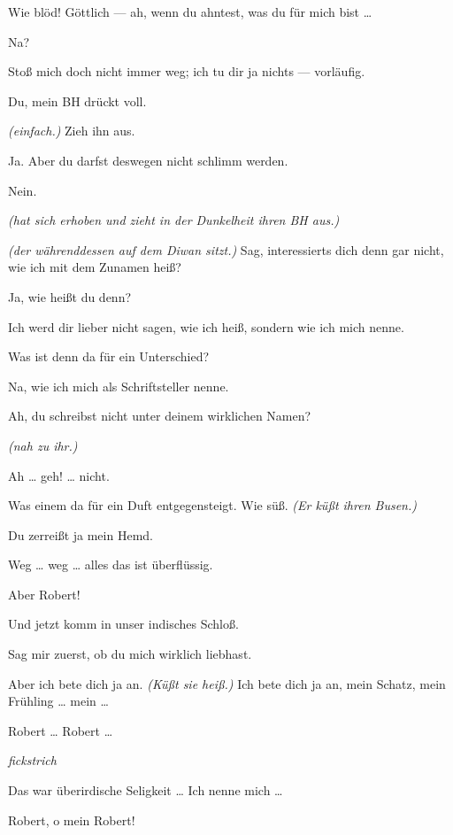 \documentclass[
	final,
	a4paper,
	ngerman,
	mpinclude = true, %
	twoside = true,
	open = right,
	cleardoublepage = plain,
	DIV = 13,
	BCOR = 1cm,
	titlepage = firstiscover,
	]{scrbook}
\newcommand{\direction}[1]{\textit{(#1)}}
\newcommand{\hiat}{%
	\begin{center}
		\tiny
		\raisebox{0.5ex}{\rule{0.3\linewidth}{0.4pt}}
		\textit{fickstrich}
		\raisebox{0.5ex}{\rule{0.3\linewidth}{0.4pt}}
	\end{center}
}
\newcommand{\thecharacter}[1]{\textup{\textsc{#1}}\xspace}
\newcommand{\thesuesse}{\thecharacter{Süßes Mädel}}
\newcommand{\thedichter}{\thecharacter{Dichter}}
\newcommand{\character}[1]{\item[#1:]}
\newcommand{\suesse}{\character{\thesuesse}}
\newcommand{\dichter}{\character{\thedichter}}
\begin{document}
\begin{play}
	\dichter
	Wie blöd! Göttlich --- ah, wenn du ahntest, was du für mich bist \ldots{}

	\suesse
	Na?

	\dichter
	Stoß mich doch nicht immer weg; ich tu dir ja nichts --- vorläufig.

	\suesse
	Du, mein BH drückt voll.

	\dichter
	\direction{einfach.} Zieh ihn aus.

	\suesse
	Ja. Aber du darfst deswegen nicht schlimm werden.

	\dichter
	Nein.

	\suesse
	\direction{hat sich erhoben und zieht in der Dunkelheit ihren BH aus.}

	\dichter
	\direction{der währenddessen auf dem Diwan sitzt.} Sag, interessierts dich denn gar nicht, wie ich mit dem Zunamen heiß?

	\suesse
	Ja, wie heißt du denn?

	\dichter
	Ich werd dir lieber nicht sagen, wie ich heiß, sondern wie ich mich nenne.

	\suesse
	Was ist denn da für ein Unterschied?

	\dichter
	Na, wie ich mich als Schriftsteller nenne.

	\suesse
	Ah, du schreibst nicht unter deinem wirklichen Namen?

	\dichter
	\direction{nah zu ihr.}

	\suesse
	Ah \ldots{} geh! \ldots{} nicht.

	\dichter
	Was einem da für ein Duft entgegensteigt. Wie süß. \direction{Er küßt ihren Busen.}

	\suesse
	Du zerreißt ja mein Hemd.

	\dichter
	Weg \ldots{} weg \ldots{} alles das ist überflüssig.

	\suesse
	Aber Robert!

	\dichter
	Und jetzt komm in unser indisches Schloß.

	\suesse
	Sag mir zuerst, ob du mich wirklich liebhast.

	\dichter
	Aber ich bete dich ja an. \direction{Küßt sie heiß.} Ich bete dich ja an, mein Schatz, mein Frühling \ldots{} mein \ldots{}

	\suesse
	Robert \ldots{} Robert \ldots{}

	\hiat

	\dichter
	Das war überirdische Seligkeit \ldots{} Ich nenne mich \ldots{}

	\suesse
	Robert, o mein Robert!


\end{play}
\end{document}
